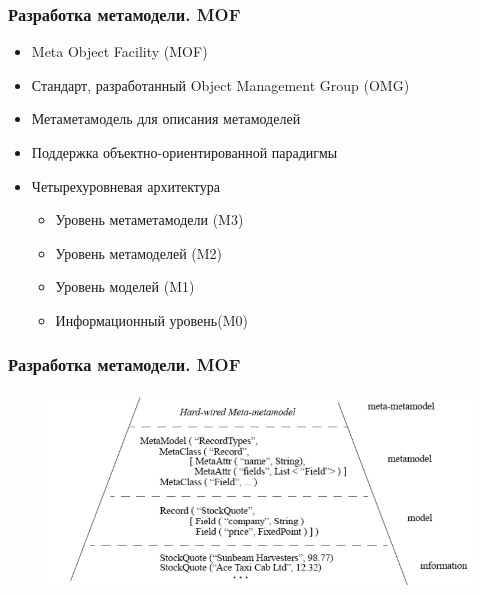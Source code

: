 \documentclass{beamer}
\begin{document}
\begin{frame}
\frametitle{Разработка метамодели. MOF}

\begin{itemize}
    \item Meta Object Facility (MOF)
    \item Стандарт, разработанный Object Management Group (OMG)
    \item Метаметамодель для описания метамоделей
    \item Поддержка объектно-ориентированной парадигмы
    \item Четырехуровневая архитектура
    \begin{itemize}
        \item Уровень метаметамодели (M3)
        \item Уровень метамоделей (M2)
        \item Уровень моделей (M1)
        \item Информационный уровень(M0)
    \end{itemize}
\end{itemize}

\end{frame}
\begin{frame}
\frametitle{Разработка метамодели. MOF}

\begin{figure}[h!]
    \begin{center}
        \includegraphics[width=\textwidth]{img/metadata_architecture}
    \end{center}
\end{figure}

\end{frame}
\end{document}
